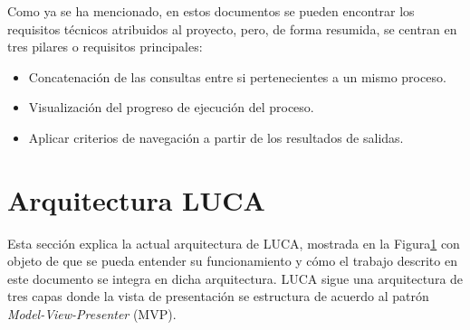 Como ya se ha mencionado, en estos documentos se pueden encontrar los requisitos técnicos atribuidos al proyecto, pero, de forma resumida, se centran en tres pilares o requisitos principales:


\begin{itemize}
	\item  Concatenación de las consultas entre si pertenecientes a un mismo proceso.
	\item  Visualización del progreso de ejecución del proceso.
	\item Aplicar criterios de navegación a partir de los resultados de salidas.
\end{itemize}



\section{Arquitectura LUCA}


Esta sección explica la actual arquitectura de LUCA, mostrada en la Figura\ref{} con objeto de que se pueda entender su funcionamiento y cómo el trabajo descrito en este documento se integra en dicha arquitectura. LUCA sigue una arquitectura de tres capas donde la vista de presentación se estructura de acuerdo al patrón \emph{Model-View-Presenter} (MVP).

